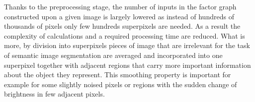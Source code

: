 Thanks to the preprocessing stage, the number of inputs in the factor graph constructed upon a given image is largely lowered as instead of hundreds of thousands of pixels only few hundreds superpixels are needed. As a result the complexity of calculations and a required processing time are reduced. What is more, by division into superpixels pieces of image that are irrelevant for the task of semantic image segmentation are averaged and incorporated into one superpixel together with adjacent regions that carry more important information about the object they represent. This smoothing property is important for example for some slightly noised pixels or regions with the sudden change of brightness in few adjacent pixels.